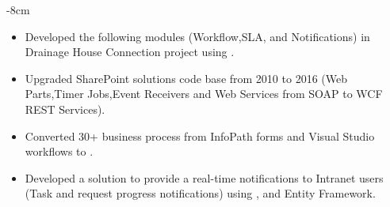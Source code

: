 \documentclass[10pt,a4paper]{altacv}
\begin{document}


\begin{adjustwidth}{}{-8cm}
\makecvheader
\end{adjustwidth}


\begin{itemize}
\item Developed the following modules (Workflow,SLA, and Notifications) in Drainage House Connection project using      . 
\item Upgraded SharePoint solutions code base from 2010 to 2016 (Web Parts,Timer Jobs,Event Receivers and Web Services from SOAP to WCF REST Services).
\item Converted 30+ business process from InfoPath forms and Visual Studio workflows to .
\item Developed a solution to provide a real-time notifications to  Intranet users (Task and request progress notifications) using ,  and Entity Framework. 

\end{itemize}

\divider
\end{document}
